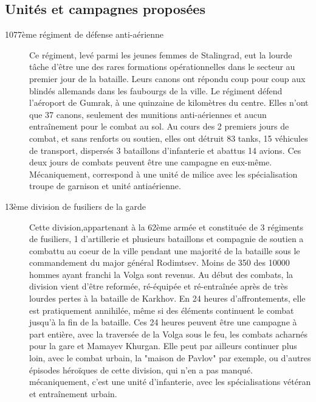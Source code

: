 \documentclass{report}
\begin{document}
\begin{multicols}{2}
\subsection{Unités et campagnes proposées}
\begin{description}
\item[1077ème régiment de défense anti-aérienne] Ce régiment, levé parmi les jeunes femmes de Stalingrad, eut la lourde tâche d'être une des rares formations opérationnelles dans le secteur au premier jour de la bataille. Leurs canons ont répondu coup pour coup aux blindés allemands dans les faubourgs de la ville. Le régiment défend l'aéroport de Gumrak, à une quinzaine de kilomètres du centre. Elles n'ont que 37 canons, seulement des munitions anti-aériennes et aucun entraînement pour le combat au sol. Au cours des 2 premiers jours de combat, et sans renforts ou soutien, elles ont détruit 83 tanks, 15 véhicules de transport, dispersés 3 bataillons d'infanterie et abattus 14 avions. Ces deux jours de combats peuvent être une campagne en eux-même. Mécaniquement, correspond à une unité de milice avec les spécialisation troupe de garnison et unité antiaérienne.
\item[13ème division de fusiliers de la garde] Cette division,appartenant à la 62ème armée et constituée de 3 régiments de fusiliers, 1 d'artillerie et plusieurs bataillons et compagnie de soutien a combattu au coeur de la ville pendant une majorité de la bataille sous le commandement du major général Rodimtsev. Moins de 350 des 10000 hommes ayant franchi la Volga sont revenus. Au début des combats, la division vient d'être reformée, ré-équipée et ré-entraînée après de très lourdes pertes à la bataille de Karkhov. En 24 heures d'affrontements, elle est pratiquement annihilée, même si des éléments continuent le combat jusqu'à la fin de la bataille. Ces 24 heures peuvent être une campagne à part entière, avec la traversée de la Volga sous le feu, les combats acharnés pour la gare et Mamayev Khurgan. Elle peut par ailleurs continuer plus loin, avec le combat urbain, la "maison de Pavlov" par exemple, ou d'autres épisodes héroïques de cette division, qui n'en a pas manqué. mécaniquement, c'est une unité d'infanterie, avec les spécialisations vétéran et entraînement urbain.

\end{description}
\end{multicols}
\end{document}

